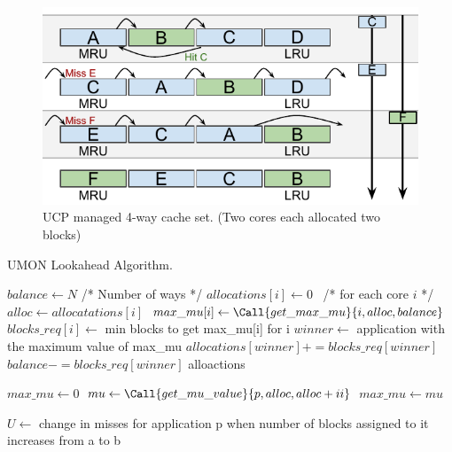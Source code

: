 \begin{figure}[ht]
    \centering
    \includegraphics[width=.65\textwidth]{figures/algorithms/UCP}
    \caption[UCP managed 4-way cache set.]{UCP managed 4-way cache set. (Two cores each allocated two blocks)}
    \label{fig:algorithms:ucp_example}
\end{figure}

\begin{algorithm}[ht]
\caption{UMON Lookahead Algorithm.}
\label{alg:algorithms:ucp}
\begin{algorithmic}[1]
\State $balance\gets N$ /* Number of ways */
\State $allocations[i]\gets 0$  /* for each core $i$ */
        \State $alloc\gets allocatations[i]$
        \State $max\_mu[i]\gets \Call{get\_max\_mu}{i, alloc, balance}$
        \State $blocks\_req[i]\gets$ min blocks to get max\_mu[i] for i
    \EndFor
    \State $winner\gets$ application with the maximum value of max\_mu
    \State $allocations[winner] += blocks\_req[winner]$
    \State $balance -= blocks\_req[winner]$
\EndWhile
\State \Return alloactions
\State

    \State $max\_mu\gets 0$
        \State $mu\gets \Call{get\_mu\_value}{p, alloc, alloc+ii}$
            \State $max\_mu\gets mu$
        \EndIf
    \EndFor
    \State {}
\EndFunction
\State

    \State $U\gets$ change in misses for application p when number of blocks assigned to it increases from a to b
    \State {}
\EndFunction
\end{algorithmic}
\end{algorithm}
